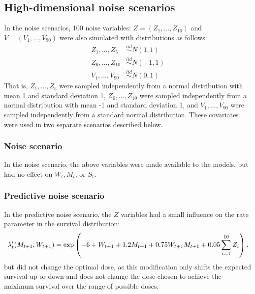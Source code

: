 \documentclass[12pt]{article}
\begin{document}

\subsection{High-dimensional noise scenarios} %
\label{sub:noise_variables}

In the noise scenarios, 100 noise variables: $Z = (Z_{1}, \ldots, Z_{10})$ and $V = (V_{1}, \ldots, V_{90})$ were also simulated with distributions as follows:
\begin{align}
  Z_{1}, \ldots, Z_{5} &\overset{iid}{\sim} N(1, 1) \\
  Z_{6}, \ldots, Z_{10} &\overset{iid}{\sim} N(-1, 1) \\
  V_{1}, \ldots, V_{90} &\overset{iid}{\sim} N(0, 1)
\end{align}
That is, $Z_{1}, \ldots, Z_{5}$ were sampled independently from a normal distribution with mean 1 and standard deviation 1, $Z_{6}, \ldots, Z_{10}$ were sampled independently from a normal distribution with mean -1 and standard deviation 1, and $V_{1}, \ldots, V_{90}$ were sampled independently from a standard normal distribution. These covariates were used in two separate scenarios described below.

\subsubsection{Noise scenario} %
\label{ssub:pure_noise}

In the noise scenario, the above variables were made available to the models, but had no effect on $W_{t}, M_{t}$, or $S_{t}$.


\subsubsection{Predictive noise scenario} %
\label{ssub:predictive_noise}
In the predictive noise scenario, the $Z$ variables had a small influence on the rate parameter in the survival distribution:
\begin{equation}
  \lambda'_{t}(M_{t+1}, W_{t+1}) = \exp\del{-6 + W_{t+1} + 1.2 M_{t+1} + 0.75 W_{t+1} M_{t+1} + 0.05 \sum_{i = 1}^{10} Z_{i}}.
\end{equation}
but did not change the optimal dose, as this modification only shifts the expected survival up or down and does not change the dose chosen to achieve the maximum survival over the range of possible doses.
\end{document}
